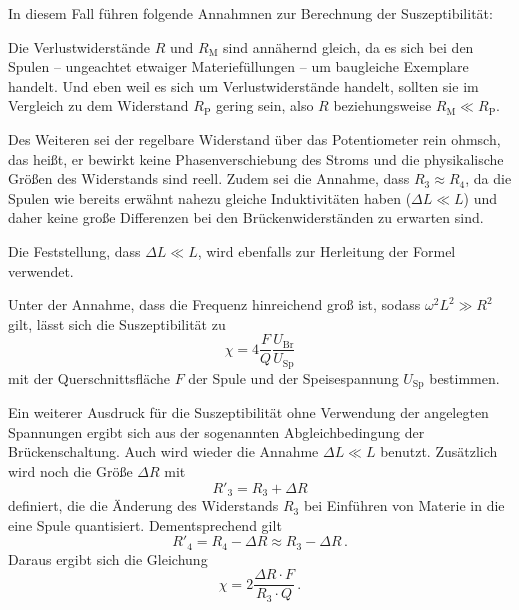     In diesem Fall führen folgende Annahmnen zur Berechnung der Suszeptibilität:

    Die Verlustwiderstände $R$ und $R_\text{M}$ sind annähernd gleich, da es sich bei den Spulen -- ungeachtet etwaiger 
    Materiefüllungen -- um baugleiche Exemplare handelt. 
    Und eben weil es sich um Verlustwiderstände handelt, sollten sie im Vergleich zu dem Widerstand $R_\text{P}$ gering sein, 
    also $R$ beziehungsweise $R_\text{M}\ll R_\text{P}$. 

    Des Weiteren sei der regelbare Widerstand über das Potentiometer rein ohmsch, das heißt, er bewirkt keine Phasenverschiebung des Stroms
    und die physikalische Größen des Widerstands sind reell. 
    Zudem sei die Annahme, dass $R_3\approx R_4$, da die Spulen wie bereits erwähnt nahezu gleiche Induktivitäten haben 
    ($\Delta L \ll L$) und daher keine große Differenzen bei den Brückenwiderständen zu erwarten sind. 

    Die Feststellung, dass $\Delta L \ll L$, wird ebenfalls zur Herleitung der Formel verwendet. 

    Unter der Annahme, dass die Frequenz hinreichend groß ist, sodass $\omega^2L^2\gg R^2$ gilt, lässt sich die Suszeptibilität
    zu 
    \begin{equation}
        \chi =4\frac{F}{Q}\frac{U_\text{Br}}{U_\text{Sp}}
        \label{eqn:hatschi}
    \end{equation}
    mit der Querschnittsfläche $F$ der Spule und der Speisespannung $U_\text{Sp}$ bestimmen\cite{Versuchsanleitung}.

    Ein weiterer Ausdruck für die Suszeptibilität ohne Verwendung der angelegten Spannungen ergibt sich aus der 
    sogenannten Abgleichbedingung  der Brückenschaltung. Auch wird wieder die Annahme $\Delta L \ll L$ benutzt. 
    Zusätzlich wird noch die Größe $\Delta R$ mit 
    \begin{equation*}
        R'_3=R_3 +\Delta R
    \end{equation*}
    definiert, die die Änderung des Widerstands $R_3$ bei Einführen von Materie in die eine Spule quantisiert.
    Dementsprechend gilt 
    \begin{equation*}
        R'_4=R_4-\Delta R \approx R_3 - \Delta R\,.
    \end{equation*}
    Daraus ergibt sich die Gleichung\cite{Versuchsanleitung}
    \begin{equation}
        \chi = 2 \frac{\Delta R \cdot F}{R_3 \cdot Q}\,.
        \label{eqn:chii2}
    \end{equation}

